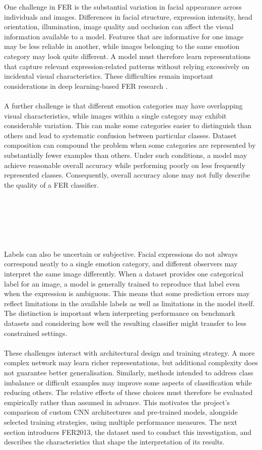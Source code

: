 \documentclass[12pt, a4paper]{report}
\begin{document}
				One challenge in FER is the substantial variation in facial appearance across individuals and images. Differences in facial structure, expression intensity, head orientation, illumination, image quality and occlusion can affect the visual information available to a model. Features that are informative for one image may be less reliable in another, while images belonging to the same emotion category may look quite different. A model must therefore learn representations that capture relevant expression-related patterns without relying excessively on incidental visual characteristics. These difficulties remain important considerations in deep learning-based FER research \cite{Sutar2023DeepFER, Georgiou2026FERReview}.\\\\
				A further challenge is that different emotion categories may have overlapping visual characteristics, while images within a single category may exhibit considerable variation. This can make some categories easier to distinguish than others and lead to systematic confusion between particular classes. Dataset composition can compound the problem when some categories are represented by substantially fewer examples than others. Under such conditions, a model may achieve reasonable overall accuracy while performing poorly on less frequently represented classes. Consequently, overall accuracy alone may not fully describe the quality of a FER classifier.\\\\\\\\\\\\\\
				Labels can also be uncertain or subjective. Facial expressions do not always correspond neatly to a single emotion category, and different observers may interpret the same image differently. When a dataset provides one categorical label for an image, a model is generally trained to reproduce that label even when the expression is ambiguous. This means that some prediction errors may reflect limitations in the available labels as well as limitations in the model itself. The distinction is important when interpreting performance on benchmark datasets and considering how well the resulting classifier might transfer to less constrained settings.\\\\
				These challenges interact with architectural design and training strategy. A more complex network may learn richer representations, but additional complexity does not guarantee better generalisation. Similarly, methods intended to address class imbalance or difficult examples may improve some aspects of classification while reducing others. The relative effects of these choices must therefore be evaluated empirically rather than assumed in advance. This motivates the project's comparison of custom CNN architectures and pre-trained models, alongside selected training strategies, using multiple performance measures. The next section introduces FER2013, the dataset used to conduct this investigation, and describes the characteristics that shape the interpretation of its results.
				
\end{document}
